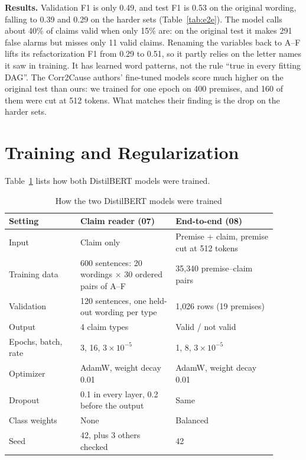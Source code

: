 \documentclass[conference]{IEEEtran}
\begin{document}
\textbf{Results.} Validation F1 is only 0.49, and test F1 is 0.53 on the original wording, falling to 0.39 and
0.29 on the harder sets (Table~\ref{tab:e2e}). The model calls about 40\% of claims valid when only 15\% are: on the
original test it makes 291 false alarms but misses only 11 valid claims. Renaming the variables back to A--F lifts
its refactorization F1 from 0.29 to 0.51, so it partly relies on the letter names it saw in training. It has
learned word patterns, not the rule ``true in every fitting DAG''. The Corr2Cause authors' fine-tuned models score
much higher on the original test than ours: we trained for one epoch on 400 premises, and 160 of them were cut at
512 tokens. What matches their finding is the drop on the harder sets.

\section{Training and Regularization}
\label{sec:training}
Table~\ref{tab:training} lists how both DistilBERT models were trained.

\begin{table}[t]
\centering
\caption{How the two DistilBERT models were trained}
\label{tab:training}
\footnotesize
\setlength{\tabcolsep}{3pt}
\begin{tabular}{p{0.24\linewidth}p{0.32\linewidth}p{0.34\linewidth}}
\toprule
Setting & Claim reader (07) & End-to-end (08) \\
\midrule
Input & Claim only & Premise + claim, premise cut at 512 tokens \\
Training data & 600 sentences: 20 wordings $\times$ 30 ordered pairs of A--F & 35{,}340 premise--claim pairs \\
Validation & 120 sentences, one held-out wording per type & 1{,}026 rows (19 premises) \\
Output & 4 claim types & Valid / not valid \\
Epochs, batch, rate & 3, 16, $3\times10^{-5}$ & 1, 8, $3\times10^{-5}$ \\
Optimizer & AdamW, weight decay 0.01 & AdamW, weight decay 0.01 \\
Dropout & 0.1 in every layer, 0.2 before the output & Same \\
Class weights & None & Balanced \\
Seed & 42, plus 3 others checked & 42 \\
\bottomrule
\end{tabular}
\end{table}
\end{document}
